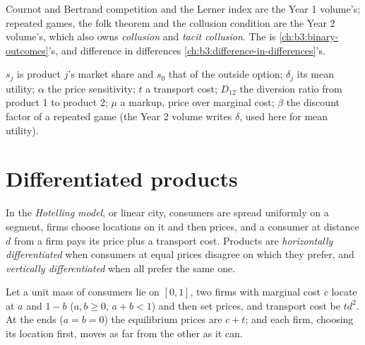 \begin{recall}
Cournot and Bertrand competition and the Lerner index are the Year 1 volume's;
repeated games, the folk theorem and the collusion condition are the Year 2 volume's,
which also owns \emph{collusion} and \emph{tacit collusion}. The  is
\cref{ch:b3:binary-outcomes}'s, and difference in differences \cref{ch:b3:difference-in-differences}'s.
\end{recall}

\begin{notation}\label{not:b3:oligopoly-and-collusion:symbols}
$s_j$ is product $j$'s market share and $s_0$ that of the outside option; $\delta_j$ its mean
utility; $\alpha$ the price sensitivity; $t$ a transport cost; $D_{12}$ the diversion ratio from
product 1 to product 2; $\mu$ a markup, price over marginal cost; $\beta$ the discount factor
of a repeated game (the Year 2 volume writes $\delta$, used here for mean utility).
\end{notation}

\section{Differentiated products}\label{sec:b3:oligopoly-and-collusion:differentiation}

\begin{definition}\label{def:b3:oligopoly-and-collusion:hotelling}
In the \emph{Hotelling model}, or linear city, consumers are spread uniformly on a
segment, firms choose locations on it and then prices, and a consumer at distance $d$ from
a firm pays its price plus a transport cost. Products are \emph{horizontally
differentiated} when consumers at equal prices disagree on which they prefer, and
\emph{vertically differentiated} when all prefer the same one.
\end{definition}

\begin{proposition}\label{prop:b3:oligopoly-and-collusion:hotelling}
Let a unit mass of consumers lie on $[0, 1]$, two firms with marginal cost $c$ locate at $a$ and $1 - b$
($a, b \ge 0$, $a + b < 1$) and then set prices, and transport cost be $t d^2$. At the ends ($a = b = 0$) the
equilibrium prices are $c + t$; and each firm, choosing its location first, moves as far
from the other as it can.
\end{proposition}

